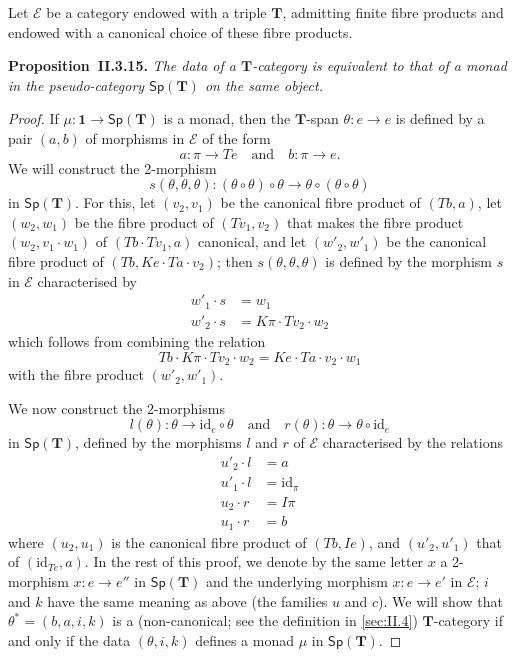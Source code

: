 \documentclass[fleqn]{article}
\newenvironment{itenv}[1]
  {\phantomsection\par\medskip\noindent\textbf{#1.}\itshape}
  {\par\medskip}
\newcommand{\oldpage}[1]{\marginpar{\footnotesize$\Big\vert$ \textit{p.~#1}}}
\newcommand{\id}{\mathrm{id}}
\newcommand{\TT}{\mathbf{T}}
\newcommand{\textand}{\quad\text{and}\quad}
\newcommand{\cat}[1]{\mathcal{#1}}
\newcommand{\Cat}[1]{\mathsf{#1}}
\newcommand{\Sp}[1]{\Cat{Sp}(#1)}
\begin{document}
\oldpage{258}
Let $\cat{E}$ be a category endowed with a triple $\TT$, admitting finite fibre products and endowed with a canonical choice of these fibre products.

\begin{itenv}{Proposition~II.3.15}
\label{proposition:II.3.15}
  The data of a $\TT$-category is equivalent to that of a monad in the pseudo-category $\Sp{\TT}$ on the same object.
\end{itenv}

\begin{proof}
  If $\mu\colon\mathbf{1}\to\Sp{\TT}$ is a monad, then the $\TT$-span $\theta\colon e\to e$ is defined by a pair $(a,b)$ of morphisms in $\cat{E}$ of the form
  \[
    a\colon\pi\to Te
    \textand
    b\colon\pi\to e.
  \]
  We will construct the 2-morphism
  \[
    s(\theta,\theta,\theta)\colon
    (\theta\circ\theta)\circ\theta
    \to \theta\circ(\theta\circ\theta)
  \]
  in $\Sp{\TT}$.
  For this, let $(v_2,v_1)$ be the canonical fibre product of $(Tb,a)$, let $(w_2,w_1)$ be the fibre product of $(Tv_1,v_2)$ that makes the fibre product $(w_2,v_1\cdot w_1)$ of $(Tb\cdot Tv_1,a)$ canonical, and let $(w'_2,w'_1)$ be the canonical fibre product of $(Tb,Ke\cdot Ta\cdot v_2)$;
  then $s(\theta,\theta,\theta)$ is defined by the morphism $s$ in $\cat{E}$ characterised by
  \[
    \begin{aligned}
      w'_1\cdot s
      &= w_1
    \\w'_2\cdot s
      &= K\pi\cdot Tv_2\cdot w_2
    \end{aligned}
    \tag{1}
  \]
  which follows from combining the relation
  \[
    Tb\cdot K\pi\cdot Tv_2\cdot w_2
    = Ke\cdot Ta\cdot v_2\cdot w_1
  \]
  with the fibre product $(w'_2,w'_1)$.

  We now construct the 2-morphisms
  \[
    l(\theta)\colon\theta\to\id_e\circ\theta
    \textand
    r(\theta)\colon\theta\to\theta\circ\id_e
  \]
  in $\Sp{\TT}$, defined by the morphisms $l$ and $r$ of $\cat{E}$ characterised by the relations
  \[
    \begin{aligned}
      u'_2\cdot l
      &= a
    \\u'_1\cdot l
      &= \id_\pi
    \\u_2\cdot r
      &= I\pi
    \\u_1\cdot r
      &= b
    \end{aligned}
    \tag{2}
  \]
  where $(u_2,u_1)$ is the canonical fibre product of $(Tb,Ie)$, and $(u'_2,u'_1)$ that of $(\id_{Te},a)$.
  \oldpage{259}
  In the rest of this proof, we denote by the same letter $x$ a 2-morphism $x\colon e\to e''$ in $\Sp{\TT}$ and the underlying morphism $x\colon e\to e'$ in $\cat{E}$; $i$ and $k$ have the same meaning as above (the families $u$ and $c$).
  We will show that $\theta^*=(b,a,i,k)$ is a (non-canonical; see the definition in \cref{sec:II.4}) $\TT$-category if and only if the data $(\theta,i,k)$ defines a monad $\mu$ in $\Sp{\TT}$.


\end{proof}
\end{document}
